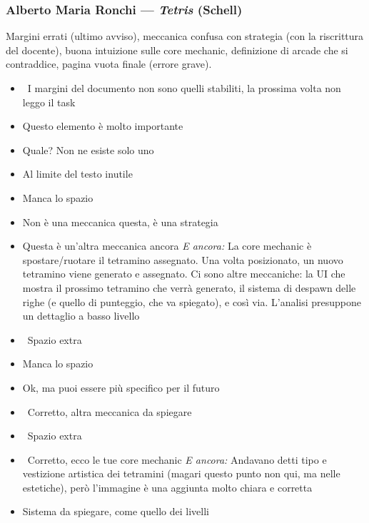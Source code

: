 \subsubsection{Alberto Maria Ronchi --- \emph{Tetris} (Schell)}
Margini errati (ultimo avviso), meccanica confusa con strategia (con la
riscrittura del docente), buona intuizione sulle core mechanic, definizione di
arcade che si contraddice, pagina vuota finale (errore grave).
{\small
\begin{itemize}
  \item {} \rvAvviso\ I margini del documento non sono quelli stabiliti, la prossima volta non leggo il task
  \item {} Questo elemento è molto importante
  \item {} Quale? Non ne esiste solo uno
  \item {} Al limite del testo inutile
  \item \rvAncora{(} Manca lo spazio
  \item {} Non è una meccanica questa, è una strategia
  \item {} Questa è un'altra meccanica ancora \emph{E ancora:} La core mechanic è spostare/ruotare il tetramino assegnato. Una volta posizionato, un nuovo tetramino viene generato e assegnato. Ci sono altre meccaniche: la UI che mostra il prossimo tetramino che verrà generato, il sistema di despawn delle righe (e quello di punteggio, che va spiegato), e così via. L'analisi presuppone un dettaglio a basso livello
  \item \rvVuoto\ Spazio extra
  \item \rvAncora{(} Manca lo spazio
  \item {} Ok, ma puoi essere più specifico per il futuro
  \item {} \rvBene\ Corretto, altra meccanica da spiegare
  \item \rvVuoto\ Spazio extra
  \item {} \rvBene\ Corretto, ecco le tue core mechanic \emph{E ancora:} Andavano detti tipo e vestizione artistica dei tetramini (magari questo punto non qui, ma nelle estetiche), però l'immagine è una aggiunta molto chiara e corretta
  \item {} Sistema da spiegare, come quello dei livelli

\end{itemize}}
